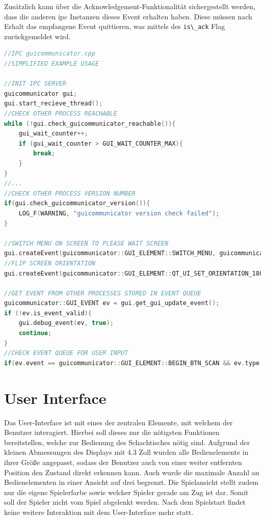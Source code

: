 Zusätzlich kann über die Acknowledgement-Funktionalität sichergestellt
werden, dass die anderen \gls{ipc} Instanzen dieses Event erhalten
haben. Diese müssen nach Erhalt das empfangene Event quittieren, was
mittels des \passthrough{\lstinline!is\_ack!} Flag zurückgemeldet wird.

\begin{lstlisting}[language={C++}]
//IPC guicommunicator.cpp
//SIMPLIFIED EXAMPLE USAGE

//INIT IPC SERVER
guicommunicator gui;
gui.start_recieve_thread();
//CHECK OTHER PROCESS REACHABLE
while (!gui.check_guicommunicator_reachable()){
    gui_wait_counter++;
    if (gui_wait_counter > GUI_WAIT_COUNTER_MAX){
        break;
    }
}
//...
//CHECK OTHER PROCESS VERSION NUMBER
if(gui.check_guicommunicator_version()){
    LOG_F(WARNING, "guicommunicator version check failed");
}

//SWITCH MENU ON SCREEN TO PLEASE WAIT SCREEN
gui.createEvent(guicommunicator::GUI_ELEMENT::SWITCH_MENU, guicommunicator::GUI_VALUE_TYPE::PROCESSING_SCREEN);
//FLIP SCREEN ORIENTATION
gui.createEvent(guicommunicator::GUI_ELEMENT::QT_UI_SET_ORIENTATION_180, guicommunicator::GUI_VALUE_TYPE::ENABLED);

//GET EVENT FROM OTHER PROCESSES STORED IN EVENT QUEUE
guicommunicator::GUI_EVENT ev = gui.get_gui_update_event();
if (!ev.is_event_valid){
    gui.debug_event(ev, true);
    continue;
}
//CHECK EVENT QUEUE FOR USER INPUT
if(ev.event == guicommunicator::GUI_ELEMENT::BEGIN_BTN_SCAN && ev.type == guicommunicator::GUI_VALUE_TYPE::CLICKED) {}
\end{lstlisting}

\hypertarget{user-interface}{%
\section{User Interface}\label{user-interface}}

Das User-Interface ist mit eines der zentralen Elemente, mit welchem der
Benutzer interagiert. Hierbei soll dieses nur die nötigsten Funktionen
bereitstellen, welche zur Bedienung des Schachtisches nötig sind.
Aufgrund der kleinen Abmessungen des Displays mit 4.3 Zoll wurden alle
Bedienelemente in ihrer Größe angepasst, sodass der Benutzer auch von
einer weiter entfernten Position den Zustand direkt erkennen kann. Auch
wurde die maximale Anzahl an Bedienelementen in einer Ansicht auf drei
begrenzt. Die Spielansicht stellt zudem nur die eigene Spielerfarbe
sowie welcher Spieler gerade am Zug ist dar. Somit soll der Spieler
nicht vom Spiel abgelenkt werden. Nach dem Spielstart findet keine
weitere Interaktion mit dem User-Interface mehr statt.

